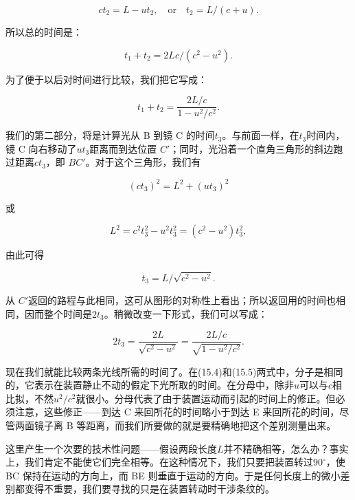 \documentclass[12pt,oneside]{book}
\begin{document}
\begin{equation*}
ct_2=L-ut_2,\quad
\text{or}\quad
t_2=L/(c+u).
\end{equation*}

所以总的时间是：

\begin{equation*}
t_1+t_2=2Lc/(c^2-u^2).
\end{equation*}


为了便于以后对时间进行比较，我们把它写成：


\begin{equation}
\label{Eq:I:15:4}
t_1+t_2=\frac{2L/c}{1-u^2/c^2}.
\end{equation}

我们的第二部分，将是计算光从 B 到镜 C 的时间$t_3$。与前面一样，在$t_3$时间内，镜 C 向右移动了$ut_3$距离而到达位置 $ C' $；同时，光沿着一个直角三角形的斜边跑过距离$ct_3$，即 $ BC' $。对于这个三角形，我们有


\begin{equation*}
(ct_3)^2 = L^2 + (ut_3)^2
\end{equation*}

或

\begin{equation*}
L^2 = c^2t_3^2 - u^2t_3^2 = (c^2 - u^2)t_3^2,
\end{equation*}

由此可得

\begin{equation*}
t_3=L/\sqrt{c^2-u^2}.
\end{equation*}

从 $ C' $返回的路程与此相同，这可从图形的对称性上看出；所以返回用的时间也相同，因而整个时间是$2t_3$。稍微改变一下形式，我们可以写成：


\begin{equation}
\label{Eq:I:15:5}
2t_3=\frac{2L}{\sqrt{c^2-u^2}}=\frac{2L/c}{\sqrt{1-u^2/c^2}}.
\end{equation}

现在我们就能比较两条光线所需的时间了。在(15.4)和(15.5)两式中，分子是相同的，它表示在装置静止不动的假定下光所取的时间。在分母中，除非$u$可以与$c$相比拟，不然$u^2/c^2$就很小。分母代表了由于装置运动而引起的时间上的修正。但必须注意，这些修正——到达 C 来回所花的时间略小于到达 E 来回所花的时间，尽管两面镜子离 B 等距离，而我们所要做的就是要精确地把这个差别测量出来。


这里产生一个次要的技术性问题——假设两段长度$L$并不精确相等，怎么办？事实上，我们肯定不能使它们完全相等。在这种情况下，我们只要把装置转过$90^{\circ}$，使 BC 保持在运动的方向上，而 BE 则垂直于运动的方向。于是任何长度上的微小差别都变得不重要，我们要寻找的只是在装置转动时干涉条纹的。
\end{document}
